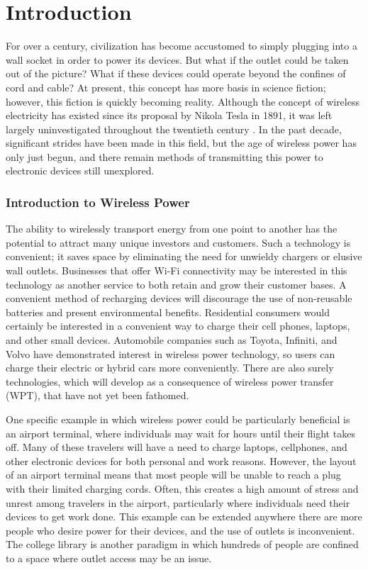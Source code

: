 \chapter{Introduction}
\label{ch:introduction}

For over a century, civilization has become accustomed to simply plugging into a wall socket in order to power its devices. But what if the outlet could be taken out of the picture? What if these devices could operate beyond the confines of cord and cable? At present, this concept has more basis in science fiction; however, this fiction is quickly becoming reality. Although the concept of wireless electricity has existed since its proposal by Nikola Tesla in 1891, it was left largely uninvestigated throughout the twentieth century \cite{NikkiT}. In the past decade, significant strides have been made in this field, but the age of wireless power has only just begun, and there remain methods of transmitting this power to electronic devices still unexplored.

\subsection{Introduction to Wireless Power}
The ability to wirelessly transport energy from one point to another has the potential to attract many unique investors and customers. Such a technology is convenient; it saves space by eliminating the need for unwieldy chargers or elusive wall outlets. Businesses that offer Wi-Fi connectivity may be interested in this technology as another service to both retain and grow their customer bases. A convenient method of recharging devices will discourage the use of non-reusable batteries and present environmental benefits. Residential consumers would certainly be interested in a convenient way to charge their cell phones, laptops, and other small devices. Automobile companies such as Toyota, Infiniti, and Volvo have demonstrated interest in wireless power technology, so users can charge their electric or hybrid cars more conveniently. There are also surely technologies, which will develop as a consequence of wireless power transfer (WPT), that have not yet been fathomed.

One specific example in which wireless power could be particularly beneficial is an airport terminal, where individuals may wait for hours until their flight takes off. Many of these travelers will have a need to charge laptops, cellphones, and other electronic devices for both personal and work reasons. However, the layout of an airport terminal means that most people will be unable to reach a plug with their limited charging cords. Often, this creates a high amount of stress and unrest among travelers in the airport, particularly where individuals need their devices to get work done. This example can be extended anywhere there are more people who desire power for their devices, and the use of outlets is inconvenient. The college library is another paradigm in which hundreds of people are confined to a space where outlet access may be an issue.

